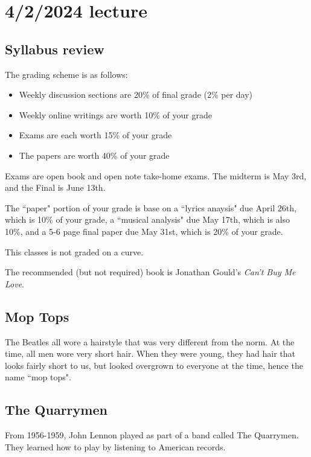 \documentclass[class=article, crop=false]{standalone}
\begin{document}
\section{4/2/2024 lecture}

\subsection{Syllabus review}

The grading scheme is as follows:
\begin{itemize}
    \item Weekly discussion sections are 20\% of final grade (2\% per day)
    \item Weekly online writings are worth 10\% of your grade
    \item Exams are each worth 15\% of your grade
    \item The papers are worth 40\% of your grade
\end{itemize}
Exams are open book and open note take-home exams. The midterm is May 3rd, and the Final is June 13th.
\par
The ``paper" portion of your grade is base on a ``lyrics anaysis" due April 26th, which is 10\% of your grade, a ``musical analysis" due May 17th, which is also 10\%, and a 5-6 page final paper due May 31st, which is 20\% of your grade.
\par
This classes is not graded on a curve.
\par
The recommended (but not required) book is Jonathan Gould's \emph{Can't Buy Me Love}.

\subsection{Mop Tops}
The Beatles all wore a hairstyle that was very different from the norm. At the time, all men wore very short hair. When they were young, they had hair that looks fairly short to us, but looked overgrown to everyone at the time, hence the name ``mop tops".

\subsection{The Quarrymen}
From 1956-1959, John Lennon played as part of a band called The Quarrymen. They learned how to play by listening to American records.
\end{document}
